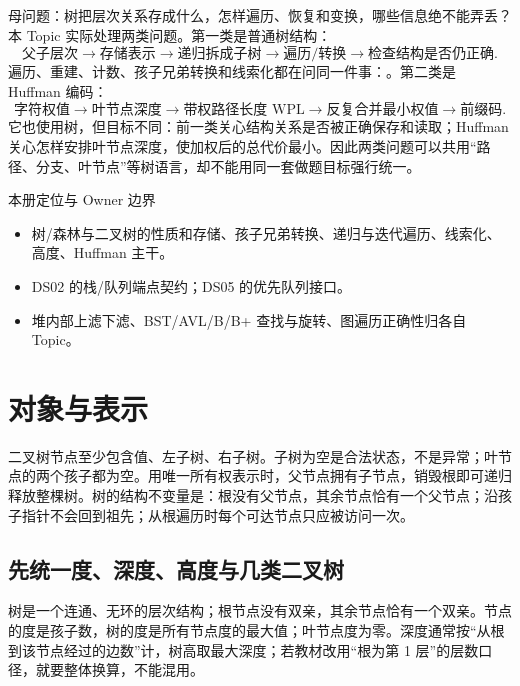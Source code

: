 \documentclass[UTF8,fontset=none,11pt,a4paper]{ctexart}
\begin{document}

\begin{corebox}{母问题：树把层次关系存成什么，怎样遍历、恢复和变换，哪些信息绝不能弄丢？}
本 Topic 实际处理两类问题。第一类是普通树结构：
\[
\text{父子层次}\to\text{存储表示}\to\text{递归拆成子树}\to\text{遍历/转换}\to\text{检查结构是否仍正确}.
\]
遍历、重建、计数、孩子兄弟转换和线索化都在问同一件事：。第二类是 Huffman 编码：
\[
\text{字符权值}\to\text{叶节点深度}\to\text{带权路径长度 WPL}\to\text{反复合并最小权值}\to\text{前缀码}.
\]
它也使用树，但目标不同：前一类关心结构关系是否被正确保存和读取；Huffman 关心怎样安排叶节点深度，使加权后的总代价最小。因此两类问题可以共用“路径、分支、叶节点”等树语言，却不能用同一套做题目标强行统一。
\end{corebox}
\begin{methodbox}{本册定位与 Owner 边界}
\begin{itemize}
\item {}树/森林与二叉树的性质和存储、孩子兄弟转换、递归与迭代遍历、线索化、高度、Huffman 主干。
\item {}DS02 的栈/队列端点契约；DS05 的优先队列接口。
\item {}堆内部上滤下滤、BST/AVL/B/B+ 查找与旋转、图遍历正确性归各自 Topic。
\end{itemize}
\end{methodbox}
\tableofcontents\newpage

\section{对象与表示}
二叉树节点至少包含值、左子树、右子树。子树为空是合法状态，不是异常；叶节点的两个孩子都为空。用唯一所有权表示时，父节点拥有子节点，销毁根即可递归释放整棵树。树的结构不变量是：根没有父节点，其余节点恰有一个父节点；沿孩子指针不会回到祖先；从根遍历时每个可达节点只应被访问一次。

\subsection{先统一度、深度、高度与几类二叉树}
树是一个连通、无环的层次结构；根节点没有双亲，其余节点恰有一个双亲。节点的度是孩子数，树的度是所有节点度的最大值；叶节点度为零。深度通常按“从根到该节点经过的边数”计，树高取最大深度；若教材改用“根为第 1 层”的层数口径，就要整体换算，不能混用。
\end{document}
